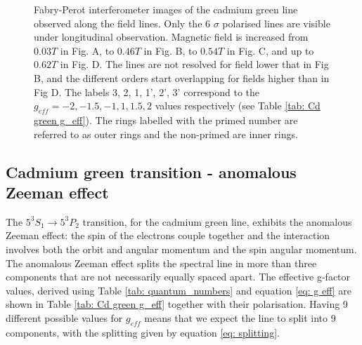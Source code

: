 \documentclass[11pt]{article}
\begin{document}
\begin{figure}[h!]
\begin{subfigure}{0.47\linewidth}
    \end{subfigure}
        \captionsetup{justification=centering}
    \caption{Fabry-Perot interferometer images of the cadmium green line observed along the field lines. Only the 6 $\sigma$ polarised lines are visible under longitudinal observation. Magnetic field is increased from $0.03 \si{T}$ in Fig. A, to $0.46 \si{T}$ in Fig. B, to $0.54 \si{T}$ in Fig. C, and up to $0.62 \si{T}$ in Fig. D. The lines are not resolved for field lower that in Fig B, and the different orders start overlapping for fields higher than in Fig D. The labels 3, 2, 1, 1', 2', 3' correspond to the $g_{eff} = -2, -1.5, -1, 1, 1.5, 2$ values respectively (see Table \ref{tab: Cd green g_eff}). The rings labelled with the primed number are referred to as outer rings and the non-primed are inner rings.}
    \label{img: Cd_green_sigma_increasing_field}
\end{figure}
\subsection{Cadmium green transition - anomalous Zeeman effect} \label{sec: Cd green}
The $5^3 S_1\rightarrow 5^3 P_2$ transition, for the cadmium green line, exhibits the anomalous Zeeman effect: the spin of the electrons couple together and the interaction involves both the orbit and angular momentum and the spin angular momentum. The anomalous Zeeman effect splits the spectral line in more than three components that are not necessarily equally spaced apart. The effective g-factor values, derived using Table \ref{tab: quantum_numbers} and equation \eqref{eq: g eff} are shown in Table \ref{tab: Cd green g_eff} together with their polarisation. Having 9 different possible values for $g_{eff}$ means that we expect the line to split into 9 components, with the splitting given by equation \eqref{eq: splitting}.
\end{document}
